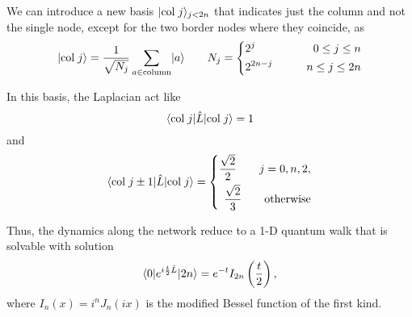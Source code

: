 We can introduce a new basis $\lvert\mathrm{col}\; j\rangle_{j<2n}$ that indicates just the column and not the single node, except for the two border nodes where they coincide, as
\begin{equation}
    \lvert\mathrm{col}\; j\rangle = \frac{1}{\sqrt{N_j}}\sum_{a\in \mathrm{column}} \lvert a\rangle \qquad N_j = \left\{\begin{aligned}
        &2^j \qquad &0\leq j\leq n\\
        &2^{2n-j} \qquad &n \leq j \leq 2n
    \end{aligned}\right.
\end{equation}

In this basis, the Laplacian act like
\begin{equation}
    \langle\mathrm{col}\; j\rvert\hat L \lvert\mathrm{col}\; j\rangle = 1
\end{equation}
and  
\begin{equation}
    \langle\mathrm{col}\; j \pm 1\rvert\hat L \lvert\mathrm{col}\; j\rangle =\left\{\begin{aligned}
        \frac{\sqrt{2}}{2} \qquad j=0,n,2,\\
        \frac{\sqrt{2}}{3} \qquad \mathrm{otherwise}\\
    \end{aligned}\right.
\end{equation}

Thus, the dynamics along the network reduce to a 1-D quantum walk that is solvable with solution \cite{quantum_walk}
\begin{equation}
    \langle0\rvert e^{i\frac{t}{2}\hat L}\lvert2n\rangle = e^{-t} I_{2n}\left(\frac{t}{2}\right),
\end{equation}
where $I_{n}(x) = i^{n}J_{n}(ix)$ is the modified Bessel function of the first kind.
